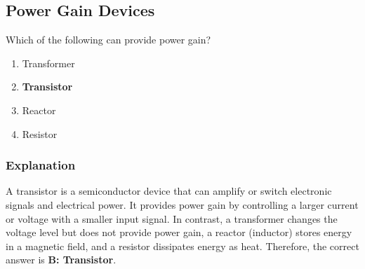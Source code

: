 \subsection{Power Gain Devices}
\label{T6B10}

\begin{tcolorbox}[colback=gray!10!white,colframe=black!75!black,title=T6B10]
Which of the following can provide power gain?
\begin{enumerate}[noitemsep]
    \item Transformer
    \item \textbf{Transistor}
    \item Reactor
    \item Resistor
\end{enumerate}
\end{tcolorbox}

\subsubsection*{Explanation}
A transistor is a semiconductor device that can amplify or switch electronic signals and electrical power. It provides power gain by controlling a larger current or voltage with a smaller input signal. In contrast, a transformer changes the voltage level but does not provide power gain, a reactor (inductor) stores energy in a magnetic field, and a resistor dissipates energy as heat. Therefore, the correct answer is \textbf{B: Transistor}.